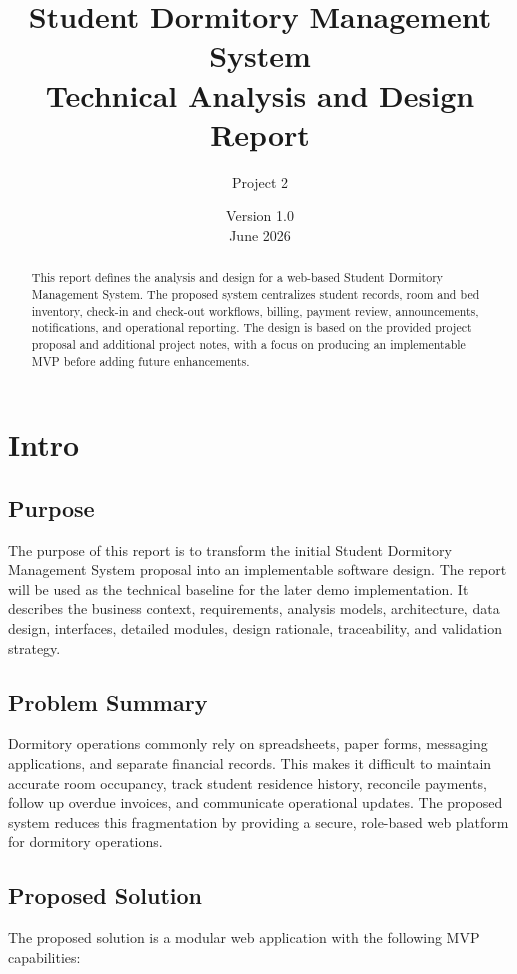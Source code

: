 \documentclass[11pt,a4paper]{article}
\title{\textbf{Student Dormitory Management System}\\Technical Analysis and Design Report}
\author{Project 2}
\date{Version 1.0\\June 2026}
\begin{document}
\maketitle
\thispagestyle{empty}

\begin{abstract}
This report defines the analysis and design for a web-based Student Dormitory Management System. The proposed system centralizes student records, room and bed inventory, check-in and check-out workflows, billing, payment review, announcements, notifications, and operational reporting. The design is based on the provided project proposal and additional project notes, with a focus on producing an implementable MVP before adding future enhancements.
\end{abstract}

\newpage
\tableofcontents
\newpage

\section{Intro}

\subsection{Purpose}
The purpose of this report is to transform the initial Student Dormitory Management System proposal into an implementable software design. The report will be used as the technical baseline for the later demo implementation. It describes the business context, requirements, analysis models, architecture, data design, interfaces, detailed modules, design rationale, traceability, and validation strategy.

\subsection{Problem Summary}
Dormitory operations commonly rely on spreadsheets, paper forms, messaging applications, and separate financial records. This makes it difficult to maintain accurate room occupancy, track student residence history, reconcile payments, follow up overdue invoices, and communicate operational updates. The proposed system reduces this fragmentation by providing a secure, role-based web platform for dormitory operations.

\subsection{Proposed Solution}
The proposed solution is a modular web application with the following MVP capabilities:
\end{document}
